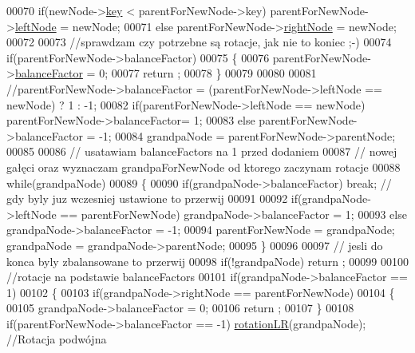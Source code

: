 \begin{DoxyCode}
00070           \textcolor{keywordflow}{if}(newNode->\hyperlink{class_a_v_l_tree_node_a717c2f6c33504a065570802e95189a57}{key} < parentForNewNode->key) parentForNewNode->\hyperlink{class_a_v_l_tree_node_afc53d4774f375c23795c9eb598f4d7cd}{leftNode} = newNode;
00071           \textcolor{keywordflow}{else} parentForNewNode->\hyperlink{class_a_v_l_tree_node_a51dfb148f27625c89a3a153760517c38}{rightNode} = newNode;
00072 
00073           \textcolor{comment}{//sprawdzam czy potrzebne są rotacje, jak nie to koniec ;-)}
00074           \textcolor{keywordflow}{if}(parentForNewNode->balanceFactor)
00075           \{
00076             parentForNewNode->\hyperlink{class_a_v_l_tree_node_a212c57dab467b42c3ddc50b2aecc05ad}{balanceFactor} = 0;
00077             return ;
00078           \}
00079 
00080 
00081           \textcolor{comment}{//parentForNewNode->balanceFactor = (parentForNewNode->leftNode == newNode) ? 1 : -1;}
00082           \textcolor{keywordflow}{if}(parentForNewNode->leftNode == newNode) parentForNewNode->balanceFactor= 1;
00083           \textcolor{keywordflow}{else}  parentForNewNode->balanceFactor = -1;
00084           grandpaNode = parentForNewNode->parentNode;
00085 
00086           \textcolor{comment}{// usatawiam balanceFactors na 1 przed dodaniem}
00087           \textcolor{comment}{// nowej gałęci oraz wyznaczam grandpaForNewNode od ktorego zaczynam rotacje}
00088           \textcolor{keywordflow}{while}(grandpaNode)
00089           \{
00090             \textcolor{keywordflow}{if}(grandpaNode->balanceFactor) \textcolor{keywordflow}{break}; \textcolor{comment}{// gdy byly juz wczesniej ustawione to przerwij}
00091 
00092             \textcolor{keywordflow}{if}(grandpaNode->leftNode == parentForNewNode) grandpaNode->balanceFactor = 1;
00093             \textcolor{keywordflow}{else} grandpaNode->balanceFactor = -1;
00094             parentForNewNode = grandpaNode; grandpaNode = grandpaNode->parentNode;
00095           \}
00096 
00097           \textcolor{comment}{// jesli do konca byly zbalansowane to przerwij}
00098           \textcolor{keywordflow}{if}(!grandpaNode) return ;
00099 
00100           \textcolor{comment}{//rotacje na podstawie balanceFactors}
00101           \textcolor{keywordflow}{if}(grandpaNode->balanceFactor == 1)
00102           \{
00103             \textcolor{keywordflow}{if}(grandpaNode->rightNode == parentForNewNode)
00104             \{
00105               grandpaNode->balanceFactor = 0;
00106               return ;
00107             \}
00108             \textcolor{keywordflow}{if}(parentForNewNode->balanceFactor == -1) \hyperlink{class_a_v_l_tree_a5751bfd512b5dfe32060a649f697d5f0}{rotationLR}(grandpaNode); \textcolor{comment}{//Rotacja podwójna
}
\end{DoxyCode}
